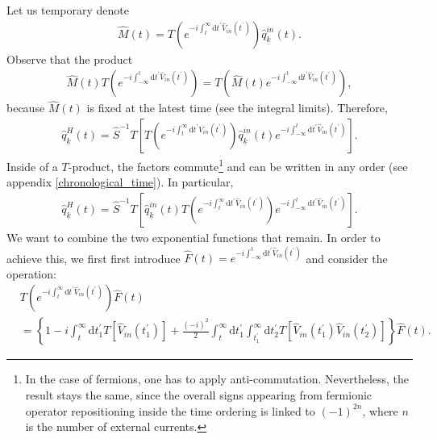 \documentclass[12pt, titlepage]{article}
\begin{document}
Let us temporary denote 
\begin{equation}
\begin{split}
	\hat{M}(t) = T\left(
	e^{-i\int_{t}^{\infty}\mathrm{d}t^{\prime} \hat{V}_{in}(t^{\prime})}	
	\right)	
	\hat{q}^{in}_{\underline{k}}(t)	
	.
\end{split}
\end{equation}
Observe that the product 
\begin{equation}
\begin{split}
	\hat{M}(t)
T
\left( 
 e^{-i\int_{-\infty}^{t}\mathrm{d}t^{\prime} \hat{V}_{in}(t^{\prime})}
\right)	
	 = 	
	 T
\left( 
\hat{M}(t)
 e^{-i\int_{-\infty}^{t}\mathrm{d}t^{\prime} \hat{V}_{in}(t^{\prime})}
\right) 
	,
\end{split}
\end{equation}
because $ \hat{M}(t) $ is fixed at the latest time (see the integral limits). Therefore,
\begin{equation}
\begin{split}
\hat{q}^{H}_{\underline{k}}(t)
=
\hat{S}^{-1} 
T
\left[ 
T
\left( 
 e^{-i\int_{t}^{\infty}\mathrm{d}t^{\prime} \hat{V}_{in}(t^{\prime})}
\right)
\hat{q}^{in}_{\underline{k}}(t)
 e^{-i\int_{-\infty}^{t}\mathrm{d}t^{\prime} \hat{V}_{in}(t^{\prime})}
\right] 
	.
\end{split}
\end{equation}
Inside of a $ T $-product, the factors commute\footnote{In the case of fermions, one has to apply anti-commutation. Nevertheless, the result stays the same, since the overall signs appearing from fermionic operator repositioning inside the time ordering is linked to $ (-1)^{2n} $, where $n $ is the number of external currents.} and can be written in any order (see appendix \ref{chronological_time}). In particular,
\begin{equation}\label{GML_v0.3}
\begin{split}
\hat{q}^{H}_{\underline{k}}(t)
=
\hat{S}^{-1} 
T
\left[ 
\hat{q}^{in}_{\underline{k}}(t)
T
\left( 
 e^{-i\int_{t}^{\infty}\mathrm{d}t^{\prime} \hat{V}_{in}(t^{\prime})}
\right)
 e^{-i\int_{-\infty}^{t}\mathrm{d}t^{\prime} \hat{V}_{in}(t^{\prime})}
\right] 
	.
\end{split}
\end{equation} 
We want to combine the two exponential functions that remain. In order to achieve this, we first first introduce $\hat{F}(t)
=
 e^{-i\int_{-\infty}^{t}\mathrm{d}t^{\prime} \hat{V}_{in}(t^{\prime})}
$ and consider the operation:
\begin{equation}\label{Moving_f_inside}
\begin{split}
& T
\left( 
 e^{-i\int_{t}^{\infty}\mathrm{d}t^{\prime} \hat{V}_{in}(t^{\prime})}
\right)
\hat{F}(t)
\\
&=
\left\lbrace 
1 
-
i
\int_{t}^{\infty}\mathrm{d}t^{\prime}_{1}
 T
 \left[ 
 \hat{V}_{in}(t^{\prime}_{1})
 \right] 
+
\frac{(-i)^{2}}{2}
\int_{t}^{\infty}\mathrm{d}t^{\prime}_{1}
\int_{t^{\prime}_{1}}^{\infty}\mathrm{d}t^{\prime}_{2}
 T
 \left[ 
 \hat{V}_{in}(t^{\prime}_{1})\hat{V}_{in}(t^{\prime}_{2})
 \right] 
\right\rbrace
\hat{F}(t)
.
\end{split}
\end{equation} 
\end{document}
